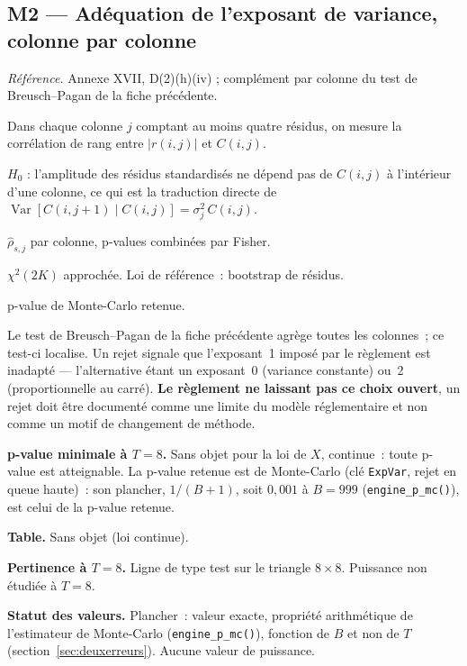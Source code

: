 \documentclass[a4paper,11pt]{article}
\newcommand{\code}[1]{\texttt{\small #1}}
\newcommand{\refl}[1]{{\small\textcolor{maincolor!70!black}{\textit{Référence.} #1}}\par\smallskip}
\newcounter{ficheid}
\newenvironment{fiche}[1]{%
  \stepcounter{ficheid}%
  \phantomsection
  \subsection{#1}%
  \label{fiche:\theficheid}%
}{%
  \end{description}\vspace{0.5em}%
}
\newcommand{\Cadre}{%
  \begin{description}[leftmargin=0pt, style=unboxed, itemsep=3pt, topsep=3pt, parsep=2pt]%
  \item[\textcolor{financeblue}{\textbf{1. Cadre, notations et hypothèses de validité (non testées).}}]}
\newcommand{\Hzero}{\item[\textcolor{financeblue}{\textbf{2. Hypothèse nulle.}}]}
\newcommand{\Stat}{\item[\textcolor{financeblue}{\textbf{3. Statistique de test.}}]}
\newcommand{\Loi}{\item[\textcolor{financeblue}{\textbf{4. Loi sous $H_0$.}}]}
\newcommand{\Pval}{\item[\textcolor{financeblue}{\textbf{5. p-value.}}]}
\newcommand{\Usage}{\item[\textcolor{financeblue}{\textbf{6. Usage et limites.}}]}
\newcommand{\Pertinence}{\item[\textcolor{financeblue}{\textbf{7. Pertinence et puissance à faible $T$.}}]}
\begin{document}
\begin{fiche}{M2 --- Adéquation de l'exposant de variance, colonne par colonne}
\label{mw:m2b}
\refl{Annexe XVII, D(2)(h)(iv) ; complément par colonne du test de
Breusch--Pagan de la fiche précédente.}
\Cadre
Dans chaque colonne $j$ comptant au moins quatre résidus, on mesure la
corrélation de rang entre $|r(i,j)|$ et $C(i,j)$.
\Hzero
$H_0$ : l'amplitude des résidus standardisés ne dépend pas de $C(i,j)$ à
l'intérieur d'une colonne, ce qui est la traduction directe de
$\operatorname{Var}[C(i,j+1)\mid C(i,j)] = \sigma_j^2\,C(i,j)$.
\Stat
$\hat\rho_{s,j}$ par colonne, p-values combinées par Fisher.
\Loi
$\chi^2(2K)$ approchée. Loi de référence~: bootstrap de résidus.
\Pval
p-value de Monte-Carlo retenue.
\Usage
Le test de Breusch--Pagan de la fiche précédente agrège toutes les colonnes~; ce
test-ci localise. Un rejet signale que l'exposant~1 imposé par le règlement est
inadapté --- l'alternative étant un exposant~0 (variance constante) ou~2
(proportionnelle au carré). \textbf{Le règlement ne laissant pas ce choix
ouvert}, un rejet doit être documenté comme une limite du modèle réglementaire
et non comme un motif de changement de méthode.
\Pertinence
\textbf{p-value minimale à $T = 8$.} Sans objet pour la loi de $X$, continue~: toute p-value est atteignable. La p-value retenue est de Monte-Carlo (clé \code{ExpVar}, rejet en queue haute)~: son plancher, $1/(B+1)$, soit $0{,}001$ à $B = 999$ (\code{engine\_p\_mc()}), est celui de la p-value retenue.

\textbf{Table.} Sans objet (loi continue).

\textbf{Pertinence à $T = 8$.} Ligne de type test sur le triangle $8\times 8$. Puissance non étudiée à $T = 8$.

\textbf{Statut des valeurs.} Plancher~: valeur exacte, propriété arithmétique de l'estimateur de Monte-Carlo (\code{engine\_p\_mc()}), fonction de $B$ et non de $T$ (section~\ref{sec:deuxerreurs}). Aucune valeur de puissance.
\end{fiche}
\end{document}
